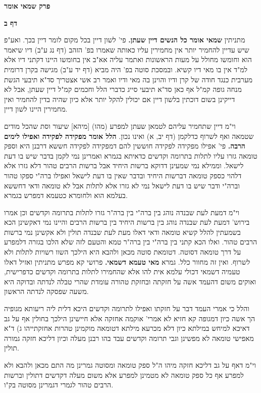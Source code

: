 \documentclass[12pt, openany]{book}
\newcommand{\sethebfont}{
\fontsize{10.5pt}{21.0pt} \selectfont
}
\newcommand{\twocol}[1]{
	{\sethebfont \begin{multicols}{2}
			#1
	\end{multicols}}	
}
\newcommand{\chapname}{}
\newcommand{\sectname}{}
\newcommand{\newchap}[1]{
	\addcontentsline{toc}{chapter}{#1}
	\renewcommand{\chapname}{#1}
		\begin{center}
			\textbf{%
\fontsize{16pt}{16pt}\selectfont
				#1}
		\end{center}
}
\newcommand{\newsection}[1]{
	\addcontentsline{toc}{section}{#1}
	\renewcommand{\sectname}{#1}	
	\vspace{-\baselineskip}
	\begin{center}
		\textbf{%
\fontsize{16pt}{16pt}\selectfont
			#1}
	\end{center}
	\vspace{-\baselineskip}
	\nopagebreak
}
\begin{document}
\newchap{פרק  שמאי אומר}
\newsection{דף ב}
\twocol{מתניתין \textbf{שמאי אומר כל הנשים דיין שעתן.} פי' לשון דיין בכל מקום לומר דיין בכך. ואע"פ שיש עדיין להחמיר יותר אין מחמירין עליו כאותה שאמרו בפ' הזהב (דף נג ע"ב) דיו שיאמר הוא וחומשו מחולל על מעות הראשונות ואתמר עליה אא"ב אין בחומשו היינו דקתני דיו אלא למ"ד אין בו מאי דיו קשיא. ובמסכת סוטה בפ' היה מביא (דף יד ע"ב) מגישה בקרן דרומית מערבית כנגד חודה של קרן ודיו והוינן בה מאי ודיו ואמר רב אשי אצטריך סד"א תיבעי הגשת מנחה גופה קמ"ל אף כאן סד"א תיבעי סייג כדברי הלל וחכמים קמ"ל דיין שעתן, אבל לא דייקינן בשום דוכתין בלשון דיין אם יכולין להקל יותר אלא כיון שהיה בדין להחמיר ואין מחמירין היינו לשון דיין.\par וי"מ דיין שתחמיר עליהם לטמאן שעתן למפרע (מהו) [מיהא] שיעור וסת שהכל מודים שטמאה ואף לשרוף כדלקמן (דף יב, א) ואינו נכון. 
\textbf{הלל אומר מפקידה לפקידה ואפילו לימים הרבה.} פי' אפילו מפקידה לפקידה חוששין להם דמפקידה לפקידה חששא דרבנן היא וספק טומאה גזרו עליו לתלות בתרומה וקדשים כדאיתא בגמרא ואמרינן נמי לקמן בדבר שיש בו דעת לישאל. וממילא נמי שמעינן דדוקא ברשות היחיד אבל ברשות הרבים טהור דלא גזרו אלא דלהוי כספק טומאה דברשות היחיד ובדבר שאין בו דעת לישאל ואפילו ברה"י ספקו טהור וברה"י ודבר שיש בו דעת לישאל נמי לא גזרו אלא לתלות אבל לא טומאה ודאי דחששא בעלמא הוא ולחומרא כטעמא דמפרש בגמרא.\par וי"מ דמעת לעת שבנדה נוהג בין ברה"י בין ברה"ר גזרו לתלות בתרומה וקדשים וכן אמרו בירוש' דמעת לעת שבנדה נוהג בין ברשות היחיד בין ברשות הרבים והיינו נמי דאקשינן הכא בשמעתין להלל קשיא טומאה ודאי דאלו מעת לעת שבנדה תולין ולא אקשינן נמי ברשות הרבים טהור. ואלו הכא קתני בין ברה"י בין ברה"ר טמא והטעם לזה שלא הלכו בגזרה דלמפרע על דרך טומאה דסוטה. דטומאת סוטה מכאן ולהבא היא הילכך השוו רשויות לתלות ולא לשרוף. ואין זה מחוור כלל. 
גמרא \textbf{מאי טעמא דשמאי.} פרושי קא מפרש מתניתין ואזיל דאלו טעמיה דשמאי דכולי עלמא אית להו אלא שהחמירו לתלות בתרומה וקדשים כדפרישית, ואוקים משום דהעמד אשה על חזקתה ובחזקת טהורה עומדת שהרי טבלה לנדתה ובדוקה היא משעה שפסקה לנדתה הראשון.\par והלל כי אמרי העמד דבר על חזקתו ואפילו לתרומה וקדשים היכא דלית ליה ריעותא מגופיה הך אשה כיון דמגופה קא חזיא לא אמרי' אוקמה אחזקה אלא חיישינן הילכך בחולין אף על גב דאיכא למיחש במילתא כיון דלא מכרעא מילתא דטומאה מוקמינן טהרות אחזקתייהו ג) ד"א מאפישי טומאה לא מפשינן וגבי תרומה וקדשים עבד בהו רבנן מעלה וכיון דליכא חזקה גמורה תולין.\par וי"מ דאף על גב דליכא חזקה מיהו ה"ל ספק טומאה ומסוטה גמרינן מה התם מכאן ולהבא ולא למפרע אף כל ספק טומאה לא מטמינן למפרע אלא משום מעלה דקדשים דתולין וברשות הרבים טהור לגמרי דגמרינן מסוטה בק"ו. 
}
\end{document}
